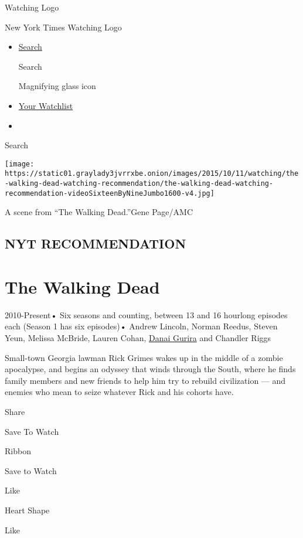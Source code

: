 \href{/watching}{}

Watching Logo

New York Times Watching Logo

\begin{itemize}
\item
  \href{/watching/search}{Search}

  Search

  Magnifying glass icon
\item
  \href{/watching/watchlist}{Your Watchlist}
\item
\end{itemize}

Search

\texttt{[image: https://static01.graylady3jvrrxbe.onion/images/2015/10/11/watching/the-walking-dead-watching-recommendation/the-walking-dead-watching-recommendation-videoSixteenByNineJumbo1600-v4.jpg]}

A scene from ``The Walking Dead.''Gene Page/AMC

\hypertarget{nyt-recommendation}{%
\subsection{NYT RECOMMENDATION}\label{nyt-recommendation}}

\hypertarget{the-walking-dead}{%
\section{The Walking Dead}\label{the-walking-dead}}

2010-Present• Six seasons and counting, between 13 and 16 hourlong
episodes each (Season 1 has six episodes)• Andrew Lincoln, Norman
Reedus, Steven Yeun, Melissa McBride, Lauren Cohan,
\href{/watching/search?q=Danai\%20Gurira\&actor=danai-gurira}{Danai
Gurira} and Chandler Riggs

Small-town Georgia lawman Rick Grimes wakes up in the middle of a zombie
apocalypse, and begins an odyssey that winds through the South, where he
finds family members and new friends to help him try to rebuild
civilization --- and enemies who mean to seize whatever Rick and his
cohorts have.

Share

Save To Watch

Ribbon

Save to Watch

Like

Heart Shape

Like

